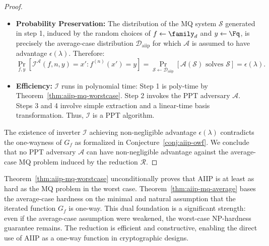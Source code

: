 \begin{proof}
\begin{itemize}
                    \item \textbf{Probability Preservation:} The distribution of the MQ system $\mathcal{S}$ generated in step 1, induced by the random choices of $f \leftarrow \family_d$ and $y \leftarrow \Fq$, is precisely the average-case distribution $\mathcal{D}_{\text{aiip}}$ for which $\mathcal{A}$ is assumed to have advantage $\epsilon(\lambda)$. Therefore:
                    \begin{equation}
                        \Pr_{f,y}[\mathcal{I}^{\mathcal{A}}(f, n, y) = x' : f^{(n)}(x') = y] = \Pr_{\mathcal{S} \gets \mathcal{D}_{\text{aiip}}}[\mathcal{A}(\mathcal{S}) \text{ solves } \mathcal{S}] = \epsilon(\lambda).
                    \end{equation}
                    \item \textbf{Efficiency:} $\mathcal{I}$ runs in polynomial time: Step 1 is poly-time by Theorem~\ref{thm:aiip-mq-worstcase}. Step 2 invokes the PPT adversary $\mathcal{A}$. Steps 3 and 4 involve simple extraction and a linear-time basis transformation. Thus, $\mathcal{I}$ is a PPT algorithm.
                \end{itemize}
                The existence of inverter $\mathcal{I}$ achieving non-negligible advantage $\epsilon(\lambda)$ contradicts the one-wayness of $G_f$ as formalized in Conjecture~\ref{conj:aiip-owf}. We conclude that no PPT adversary $\mathcal{A}$ can have non-negligible advantage against the average-case MQ problem induced by the reduction $\mathcal{R}$.
            \end{proof}
            \begin{remark}\label{rm:reduction-interpretation}
                Theorem~\ref{thm:aiip-mq-worstcase} unconditionally proves that AIIP is at least as hard as the MQ problem in the worst case. Theorem~\ref{thm:aiip-mq-average} bases the average-case hardness on the minimal and natural assumption that the iterated function $G_f$ is one-way. This dual foundation is a significant strength: even if the average-case assumption were weakened, the worst-case NP-hardness guarantee remains. The reduction is efficient and constructive, enabling the direct use of AIIP as a one-way function in cryptographic designs.
            \end{remark}
        
